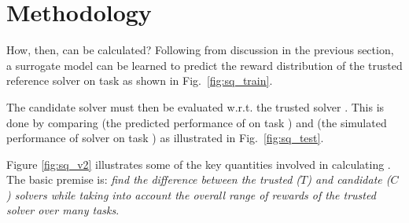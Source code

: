 \section{Methodology} \label{sec:methodology}
How, then, can \xQ{} be calculated? Following from discussion in the previous section, a surrogate model \surrogate{} can be learned to predict the reward distribution \rwdstarapprox{} of the trusted reference solver \solvestar{} on task \task{} as shown in Fig.~\ref{fig:sq_train}.

The candidate solver \solve{} must then be evaluated w.r.t. the trusted solver \solvestar{}. This is done by comparing \rwdstarapprox{} (the predicted performance of \solvestar{} on task \task) and \rwd{} (the simulated performance of solver \solve{} on task \task) as illustrated in Fig.~\ref{fig:sq_test}.

Figure \ref{fig:sq_v2} illustrates some of the key quantities involved in calculating \xQ. The basic premise is: \emph{find the difference between the trusted ($T$) and candidate ($C$) solvers while taking into account the overall range of rewards of the trusted solver over many tasks}.

